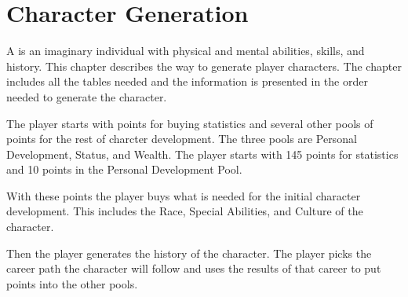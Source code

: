 \chapter{Character Generation}

A  is an imaginary individual
with physical and mental abilities, skills, and history. This chapter
describes the way to generate player characters. The chapter
includes all the tables needed and the information is presented in
the order needed to generate the character.

The player starts with points for buying statistics and several other pools 
of points for the rest of charcter development. The three 
pools are Personal Development, Status, and Wealth. The player starts 
with 145 points for statistics and 10 points in the Personal 
Development Pool. 

With these points the player buys what is needed for the initial 
character development. This includes the Race, Special Abilities, and 
Culture of the character. 

Then the player generates the history of the character. The player 
picks the career path the character will follow and uses the results 
of that career to put points into the other pools. 

